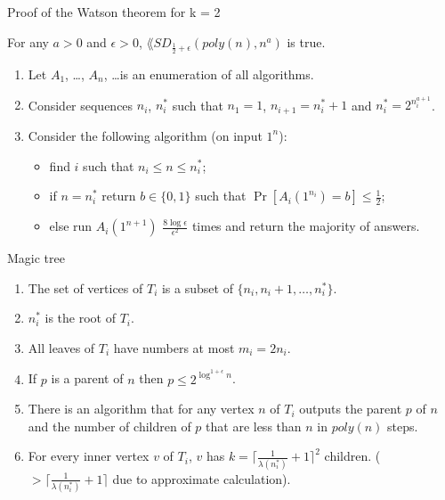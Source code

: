 \begin{frame}{Proof of the Watson theorem for k = 2}

    \begin{theorem}[Watson, 2013]
        For any $a > 0$ and $\epsilon > 0$,
        $\lang{SD}_{\frac{1}{2} + \epsilon}(poly(n), n^a)$
        is true.
    \end{theorem}
	\pause

	\begin{enumerate}
        \item Let $A_1$, \dots, $A_n$, \dots is an enumeration of all algorithms.
    	\pause    
		\item Consider sequences $n_i$, $n^*_i$ such that $n_1 = 1$, $n_{i + 1} = n^*_i + 1$ and $n^*_i =
			2^{n^{a + 1}_i}$.
    	\pause
		\item Consider the following algorithm (on input $1^n$):
			\begin{itemize}
				\item find $i$ such that $n_i \le n \le n^*_i$;
				\item if $n = n^*_i$ return $b \in \{0, 1\}$ such that $\Pr[A_i(1^{n_i}) = b] \le \frac{1}{2}$;
				\item else run $A_i(1^{n + 1})$ $\frac{8 \log \epsilon}{\epsilon^2}$ times and return the majority of
					answers.
			\end{itemize}
	\end{enumerate}
\end{frame}


\begin{frame}{Magic tree}
    
	\begin{enumerate}
		\item The set of vertices of $T_i$ is a subset of $\{n_i, n_i + 1, \dots, n_i^*\}$.
		\item $n_i^*$ is the root of $T_i$.
		\item All leaves of $T_i$ have numbers at most $m_i = 2 n_i$.
        \item If $p$ is a parent of $n$ then $p \le 2^{\log^{1 + \epsilon} n}$.
		\item There is an algorithm that for any vertex $n$ of $T_i$ outputs the parent $p$ of $n$ and the number of children
	        of $p$ that are less than $n$ in $poly(n)$ steps.
		\item For every inner vertex $v$ of $T_i$, $v$ has $k = \lceil \frac{1}{\lambda(n_i^*)} + 1 \rceil^2$ children. ($>
            \lceil \frac{1}{\lambda(n_i^*)} + 1 \rceil$ due to approximate calculation).
	\end{enumerate}
\end{frame}


